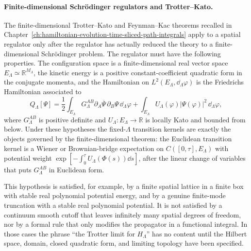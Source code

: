 \paragraph{Finite-dimensional Schr\"odinger regulators and Trotter--Kato.}
The finite-dimensional Trotter--Kato and Feynman--Kac theorems recalled in
Chapter~\ref{ch:hamiltonian-evolution-time-sliced-path-integrals} apply to a
spatial regulator only after the regulator has actually reduced the theory to a
finite-dimensional Schr\"odinger problem.  The regulator must have the following
properties.  The configuration space is a finite-dimensional real vector space
\(E_\Lambda\simeq\mathbb R^{M_\Lambda}\), the kinetic energy is a positive
constant-coefficient quadratic form in the conjugate momenta, and the
Hamiltonian on \(L^2(E_\Lambda,\dd_\Lambda\varphi)\) is the Friedrichs
Hamiltonian associated to
\[
  Q_\Lambda[\Psi]
  =
  \frac12
  \int_{E_\Lambda}
  G_\Lambda^{AB}
  \partial_A\overline{\Psi}\,
  \partial_B\Psi\,
  \dd_\Lambda\varphi
  +
  \int_{E_\Lambda}
  U_\Lambda(\varphi)|\Psi(\varphi)|^2\,
  \dd_\Lambda\varphi ,
\]
where \(G_\Lambda^{AB}\) is positive definite and
\(U_\Lambda:E_\Lambda\to\mathbb R\) is locally Kato and bounded from below.
Under these hypotheses the fixed-\(\Lambda\) transition kernels are exactly the
objects governed by the finite-dimensional theorem: the Euclidean transition
kernel is a Wiener or Brownian-bridge expectation on
\(C([0,\tau],E_\Lambda)\) with potential weight
\(\exp[-\int_0^\tau U_\Lambda(\Phi(s))\dd s]\), after the linear change of
variables that puts \(G_\Lambda^{AB}\) in Euclidean form.

This hypothesis is satisfied, for example, by a finite spatial lattice in a
finite box with stable real polynomial potential energy, and by a genuine
finite-mode truncation with a stable real polynomial potential.  It is not
satisfied by a continuum smooth cutoff that leaves infinitely many spatial
degrees of freedom, nor by a formal rule that only modifies the propagator in
a functional integral.  In those cases the phrase ``the Trotter limit for
\(H_\Lambda\)'' has no content until the Hilbert space, domain, closed
quadratic form, and limiting topology have been specified.


